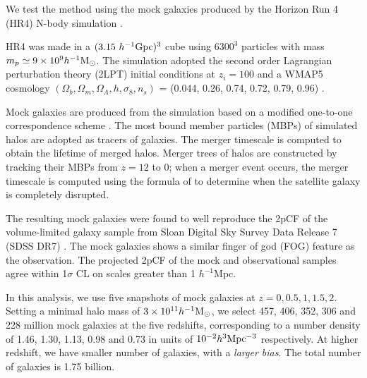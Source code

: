 \documentclass[iop]{emulateapj}
\newcommand{\hMsun}{{\ifmmode{h^{-1}{\rm
        {M_{\odot}}}}\else{$h^{-1}{\rm{M_{\odot}}}$~}\fi}}
\begin{document}
We test the method using the mock galaxies produced by the Horizon Run 4  (HR4) N-body simulation \citep{hr4,hong2016}.

HR4 was made in a $({3.15}\ h^{-1}\rm Gpc)^3$ cube using  $6300^3$ particles with mass $m_p\simeq 9 \times 10^9 \hMsun$.
The simulation adopted the second order Lagrangian perturbation theory (2LPT) initial conditions at $z_{i}=100$
and a WMAP5 cosmology $(\Omega_{b},\Omega_{m},\Omega_\Lambda,h,\sigma_8,n_s)$  = (0.044, 0.26, 0.74, 0.72, 0.79, 0.96) \citep{komatsu 2011}.

Mock galaxies are produced from the simulation based on a modified one-to-one correspondence scheme \citep{hong2016}. 
The most bound member particles (MBPs) of simulated halos are adopted as tracers of galaxies.
The merger timescale is computed to obtain the lifetime of merged halos.
Merger trees of halos are constructed by tracking their MBPs from $z = 12$ to 0;
when a merger event occurs, the merger timescale is computed using the formula of \cite{jiang2008} to 
determine when the satellite galaxy is completely disrupted.

The resulting mock galaxies were found to well reproduce the 2pCF of the volume-limited galaxy sample from Sloan Digital Sky Survey Data Release 7 (SDSS DR7) \citep{zehavi2011}.
The mock galaxies shows a similar finger of god (FOG) feature \citep{FOG} as the observation.
The projected 2pCF of the mock and observational samples agree within 1$\sigma$ CL
on scales greater than 1 ${h^{-1}}$Mpc.

In this analysis, we use five snapshots of mock galaxies at $z=0,0.5,1,1.5,2$.
Setting a minimal halo mass of $3\times 10^{11} \hMsun$, 
we select 457, 406, 352, 306 and 228 million mock galaxies at the five redshifts,
corresponding to a number density of 
1.46, 1.30, 1.13, 0.98 and 0.73 in units of $ 10^{-2} h^{3} \rm Mpc^{-3}$
respectively.
At higher redshift, we have smaller number of galaxies, with a {\it larger bias}.
The total number of galaxies is 1.75 billion.
\end{document}
